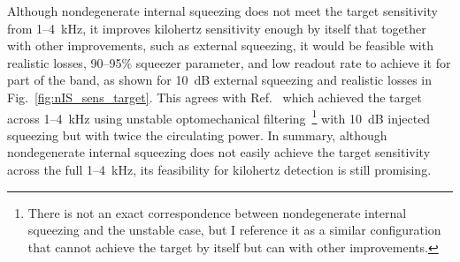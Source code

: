 Although nondegenerate internal squeezing does not meet the target sensitivity from 1--4~kHz, it improves kilohertz sensitivity enough by itself that together with other improvements, such as external squeezing, it would be feasible with realistic losses, 90--95$\%$ squeezer parameter, and low readout rate to achieve it for part of the band, as shown for 10~dB external squeezing and realistic losses in Fig.~\ref{fig:nIS_sens_target}. This agrees with Ref.~\cite{miaoDesignGravitationalWaveDetectors2018} which achieved the target across 1--4~kHz using unstable optomechanical filtering~\footnote{There is not an exact correspondence between nondegenerate internal squeezing and the unstable case, but I reference it as a similar configuration that cannot achieve the target by itself but can with other improvements.} with 10~dB injected squeezing but with twice the circulating power. %
In summary, although nondegenerate internal squeezing does not easily achieve the target sensitivity across the full 1--4~kHz, its feasibility for kilohertz detection is still promising.


\label{sec:signalRO_broadband}

